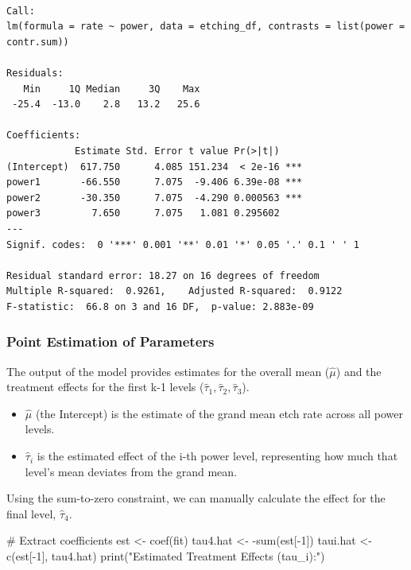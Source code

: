 \documentclass[
  letterpaper,
]{scrbook}
\newenvironment{Shaded}{\begin{snugshade}}{\end{snugshade}}
\newcommand{\CommentTok}[1]{\textcolor[rgb]{0.37,0.37,0.37}{#1}}
\newcommand{\DecValTok}[1]{\textcolor[rgb]{0.68,0.00,0.00}{#1}}
\newcommand{\FunctionTok}[1]{\textcolor[rgb]{0.28,0.35,0.67}{#1}}
\newcommand{\NormalTok}[1]{\textcolor[rgb]{0.00,0.23,0.31}{#1}}
\newcommand{\OtherTok}[1]{\textcolor[rgb]{0.00,0.23,0.31}{#1}}
\newcommand{\SpecialCharTok}[1]{\textcolor[rgb]{0.37,0.37,0.37}{#1}}
\newcommand{\StringTok}[1]{\textcolor[rgb]{0.13,0.47,0.30}{#1}}
\providecommand{\tightlist}{%
  \setlength{\itemsep}{0pt}\setlength{\parskip}{0pt}}\usepackage{longtable,booktabs,array}
\begin{document}
\begin{verbatim}

Call:
lm(formula = rate ~ power, data = etching_df, contrasts = list(power = contr.sum))

Residuals:
   Min     1Q Median     3Q    Max 
 -25.4  -13.0    2.8   13.2   25.6 

Coefficients:
            Estimate Std. Error t value Pr(>|t|)    
(Intercept)  617.750      4.085 151.234  < 2e-16 ***
power1       -66.550      7.075  -9.406 6.39e-08 ***
power2       -30.350      7.075  -4.290 0.000563 ***
power3         7.650      7.075   1.081 0.295602    
---
Signif. codes:  0 '***' 0.001 '**' 0.01 '*' 0.05 '.' 0.1 ' ' 1

Residual standard error: 18.27 on 16 degrees of freedom
Multiple R-squared:  0.9261,    Adjusted R-squared:  0.9122 
F-statistic:  66.8 on 3 and 16 DF,  p-value: 2.883e-09
\end{verbatim}

\subsubsection{Point Estimation of
Parameters}\label{point-estimation-of-parameters}

The output of the model provides estimates for the overall mean
(\(\hat{\mu}\)) and the treatment effects for the first k-1 levels
(\(\hat{\tau}_1, \hat{\tau}_2, \hat{\tau}_3\)).

\begin{itemize}
\tightlist
\item
  \(\hat{\mu}\) (the Intercept) is the estimate of the grand mean etch
  rate across all power levels.
\item
  \(\hat{\tau}_i\) is the estimated effect of the i-th power level,
  representing how much that level's mean deviates from the grand mean.
\end{itemize}

Using the sum-to-zero constraint, we can manually calculate the effect
for the final level, \(\hat{\tau}_4\).

\begin{Shaded}
\begin{Highlighting}[]
\CommentTok{\# Extract coefficients}
\NormalTok{est }\OtherTok{\textless{}{-}} \FunctionTok{coef}\NormalTok{(fit)}
\NormalTok{tau4.hat }\OtherTok{\textless{}{-}} \SpecialCharTok{{-}}\FunctionTok{sum}\NormalTok{(est[}\SpecialCharTok{{-}}\DecValTok{1}\NormalTok{])}
\NormalTok{taui.hat }\OtherTok{\textless{}{-}} \FunctionTok{c}\NormalTok{(est[}\SpecialCharTok{{-}}\DecValTok{1}\NormalTok{], tau4.hat)}
\FunctionTok{print}\NormalTok{(}\StringTok{"Estimated Treatment Effects (tau\_i):"}\NormalTok{)}
\end{Highlighting}
\end{Shaded}
\end{document}
